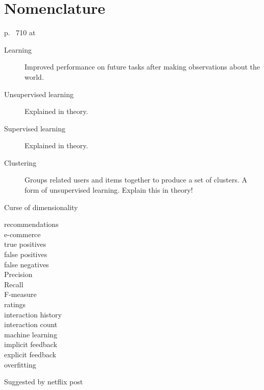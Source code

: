 \chapter{Nomenclature}\label{cha:def}

p. ~710 at \citep{norvigAI}

\begin{description}
    \item[Learning] Improved performance on future tasks after making observations about the world.

    \item[Unsupervised learning] Explained in theory.

    \item[Supervised learning] Explained in theory.

    \item[Clustering] Groups related users and items together to produce a set of clusters. A form of unsupervised learning. 
Explain this in theory!

    \item[Curse of dimensionality]
\end{description}

\vspace{2cm}

\begin{description}
    \item[recommendations]
    \item[e-commerce]
    \item[true positives]
    \item[false positives]
    \item[false negatives]
    \item[Precision]
    \item[Recall]
    \item[F-measure]
    \item[ratings]
    \item[interaction history]
    \item[interaction count]
    \item[machine learning]
    \item[implicit feedback]
    \item[explicit feedback]
    \item[overfitting]
\end{description}

Suggested by netflix post

